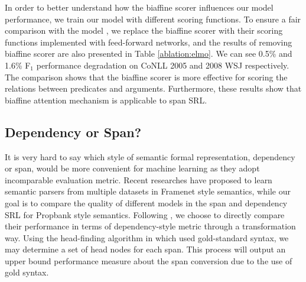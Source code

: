 \documentclass[letterpaper]{article} %
\begin{document}
In order to better understand how the biaffine scorer influences our model performance, we train our model with different scoring functions. To ensure a fair comparison with the model \cite{he2018jointly}, we replace the biaffine scorer with their scoring functions implemented with feed-forward networks, and the results of removing biaffine scorer are also presented in Table \ref{ablation:elmo}. We can see 0.5\% and 1.6\% F$_1$ performance degradation on CoNLL 2005 and 2008 WSJ respectively. The comparison shows that the biaffine scorer is more effective for scoring the relations between predicates and arguments. Furthermore, these results show that biaffine attention mechanism is applicable to span SRL. 

\subsection{Dependency or Span?}
It is very hard to say which style of semantic formal representation, dependency or span, would be more convenient for machine learning as they adopt incomparable evaluation metric. Recent researches \cite{peng2018learning} have proposed to learn semantic parsers from multiple datasets in Framenet style semantics, while our goal is to compare the quality of different models in the span and dependency SRL for Propbank style semantics. Following \citeauthor{johansson2008EMNLP} , we choose to directly compare their performance in terms of dependency-style metric through a transformation way. 
Using the head-finding algorithm in \cite{johansson2008EMNLP} which used gold-standard syntax, we may determine a set of head nodes for each span. This process will output an upper bound performance measure about the span conversion due to the use of gold syntax.
\end{document}
